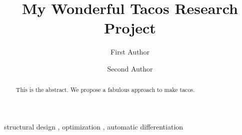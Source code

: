 \documentclass[final,5p,times,twocolumn]{elsarticle} %
\newcommand*{\sectionpath}{./sections}
\newcommand*{\bibliopath}{./biblio}
\newcommand*{\appendixpath}{./appendix}
\begin{document}
\begin{frontmatter}


\title{My Wonderful Tacos Research Project}

\author[1]{First Author}
\author[2]{Second Author}


\address[1]{Fancy School, Awesome University, Wakanda}
\address[1]{School of Engineering, Monsters University, Tomorrowland}

\begin{abstract}
This is the abstract.
We propose a fabulous approach to make tacos.
\end{abstract}


\begin{keyword}
structural design \sep
optimization \sep
automatic differentiation
\end{keyword}

\end{frontmatter}
\raggedbottom
{}
















\end{document}
